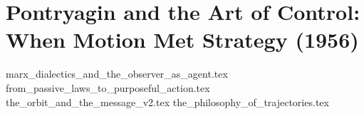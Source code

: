 \section{Pontryagin and the Art of Control: When Motion Met Strategy (1956)}

{marx_dialectics_and_the_observer_as_agent.tex}
{from_passive_laws_to_purposeful_action.tex}
{the_orbit_and_the_message_v2.tex}
{the_philosophy_of_trajectories.tex}